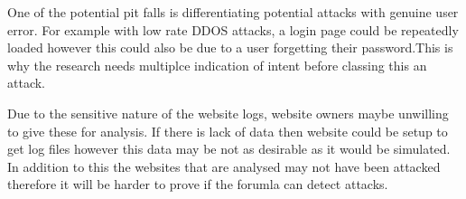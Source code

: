 One of the potential pit falls is differentiating potential attacks with genuine user error. For example with low rate DDOS attacks, a login page could be repeatedly loaded however this could also be due to a user forgetting their password.This is why the research needs multiplce indication of intent before classing this an attack.  

Due to the sensitive nature of the website logs, website owners maybe unwilling to give these for analysis. If there is lack of data then website could be setup to get log files however this data may be not as desirable as it would be simulated. In addition to this the websites that are analysed may not have been attacked therefore it will be harder to prove if the forumla can detect attacks.


